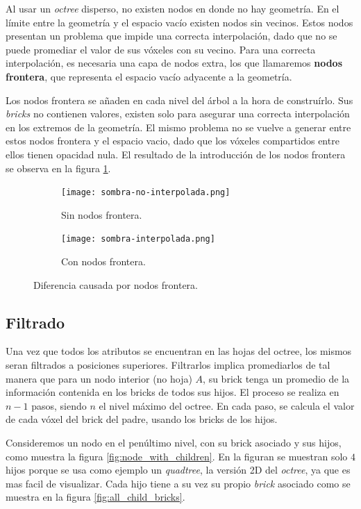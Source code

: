 Al usar un \textit{octree} disperso, no existen nodos en donde no hay geometría.
En el límite entre la geometría y el espacio vacío existen nodos sin vecinos.
Estos nodos presentan un problema que impide una correcta interpolación, dado que no se puede promediar el valor de sus vóxeles con su vecino.
Para una correcta interpolación, es necesaria una capa de nodos extra, los que llamaremos \textbf{nodos frontera}, que representa el espacio vacío adyacente a la geometría.

Los nodos frontera se añaden en cada nivel del árbol a la hora de construírlo.
Sus \textit{bricks} no contienen valores, existen solo para asegurar una correcta interpolación en los extremos de la geometría.
El mismo problema no se vuelve a generar entre estos nodos frontera y el espacio vacio, dado que los vóxeles compartidos entre ellos tienen opacidad nula.
El resultado de la introducción de los nodos frontera se observa en la figura \ref{fig:nodos_frontera}.

\begin{figure}
    \begin{subfigure}{.5\textwidth}
        \centering
        \texttt{[image: sombra-no-interpolada.png]}
        \caption{Sin nodos frontera.}
    \end{subfigure}
    \begin{subfigure}{.5\textwidth}
        \centering
        \texttt{[image: sombra-interpolada.png]}
        \caption{Con nodos frontera.}
    \end{subfigure}
    \caption{Diferencia causada por nodos frontera.}
    \label{fig:nodos_frontera}
\end{figure}

\subsection{Filtrado}\label{design:filtering}

Una vez que todos los atributos se encuentran en las hojas del octree, los mismos seran filtrados a posiciones superiores.
Filtrarlos implica promediarlos de tal manera que para un nodo interior (no hoja) $A$, su brick tenga un promedio de la información contenida en los bricks de todos sus hijos.
El proceso se realiza en $n - 1$ pasos, siendo $n$ el nivel máximo del octree.
En cada paso, se calcula el valor de cada vóxel del brick del padre, usando los bricks de los hijos.

Consideremos un nodo en el penúltimo nivel, con su brick asociado y sus hijos, como muestra la figura \ref{fig:node_with_children}.
En la figuran se muestran solo $4$ hijos porque se usa como ejemplo un \textit{quadtree}, la versión 2D del \textit{octree}, ya que es mas facil de visualizar.
Cada hijo tiene a su vez su propio \textit{brick} asociado como se muestra en la figura \ref{fig:all_child_bricks}.

